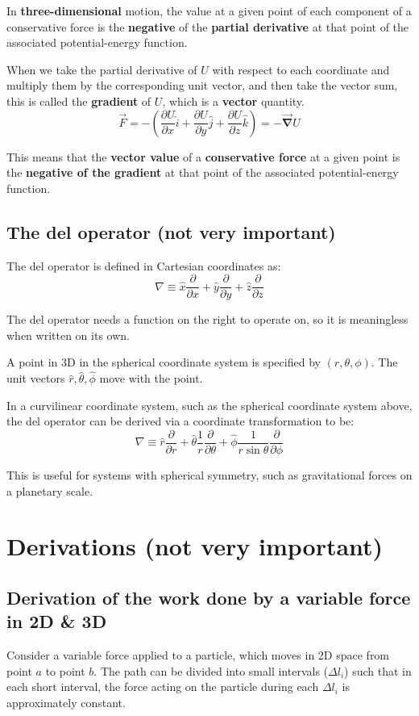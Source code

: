 \documentclass[11pt]{article}
\begin{document}
In \textbf{three-dimensional} motion, the value at a given point of each component of a conservative force is the \textbf{negative} of the \textbf{partial derivative} at that point of the associated potential-energy function.


When we take the partial derivative of \(U\) with respect to each coordinate and multiply them by the corresponding unit vector, and then take the vector sum, this is called the \textbf{gradient} of \(U\), which is a \textbf{vector} quantity.
\[\vec{F} = - \left( \frac{\partial U}{\partial x} \hat{i} + \frac{\partial U}{\partial y} \hat{j} + \frac{\partial U}{\partial z} \hat{k} \right) = - \vec{\boldsymbol{\nabla}} U\]

This means that the \textbf{vector value} of a \textbf{conservative force} at a given point is the \textbf{negative of the gradient} at that point of the associated potential-energy function.
\subsection{The del operator (not very important)}
\label{sec:org00a49f7}
The del operator is defined in Cartesian coordinates as:
\[\nabla \equiv \hat{x} \frac{\partial}{\partial x} + \hat{y} \frac{\partial}{\partial y} + \hat{z} \frac{\partial}{\partial z}\]

The del operator needs a function on the right to operate on, so it is meaningless when written on its own.


A point in 3D in the spherical coordinate system is specified by \((r, \theta, \phi)\). The unit vectors \(\hat{r}, \hat{\theta}, \hat{\phi}\) move with the point.


In a curvilinear coordinate system, such as the spherical coordinate system above, the del operator can be derived via a coordinate transformation to be:
\[\nabla \equiv \hat{r} \frac{\partial}{\partial r} + \hat{\theta} \frac{1}{r} \frac{\partial}{\partial \theta} + \hat{\phi} \frac{1}{r \sin \theta} \frac{\partial}{\partial \phi}\]

This is useful for systems with spherical symmetry, such as gravitational forces on a planetary scale.
\section{Derivations (not very important)}
\label{sec:org93db96f}

\subsection{Derivation of the work done by a variable force in 2D \& 3D}
\label{sec:org6c7f85f}
Consider a variable force applied to a particle, which moves in 2D space from point \(a\) to point \(b\). The path can be divided into small intervals (\(\Delta l_i\)) such that in each short interval, the force acting on the particle during each \(\Delta l_i\) is approximately constant.
\end{document}
